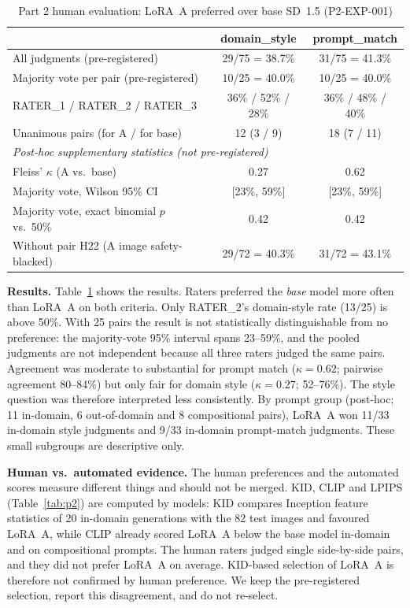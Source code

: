 \documentclass[conference]{IEEEtran}
\begin{document}
\begin{table}[t]\centering\caption{Part 2 human evaluation: LoRA~A preferred over base SD~1.5 (P2-EXP-001)}\label{tab:p2human}
\begin{tabular}{lcc}\toprule
 & domain\_style & prompt\_match\\\midrule
All judgments (pre-registered) & 29/75 = 38.7\% & 31/75 = 41.3\%\\
Majority vote per pair (pre-registered) & 10/25 = 40.0\% & 10/25 = 40.0\%\\
RATER\_1 / RATER\_2 / RATER\_3 & 36\% / 52\% / 28\% & 36\% / 48\% / 40\%\\
Unanimous pairs (for A / for base) & 12 (3 / 9) & 18 (7 / 11)\\\midrule
\multicolumn{3}{l}{\emph{Post-hoc supplementary statistics (not pre-registered)}}\\
Fleiss' $\kappa$ (A vs.\ base) & 0.27 & 0.62\\
Majority vote, Wilson 95\% CI & [23\%, 59\%] & [23\%, 59\%]\\
Majority vote, exact binomial $p$ vs.\ 50\% & 0.42 & 0.42\\
Without pair H22 (A image safety-blacked) & 29/72 = 40.3\% & 31/72 = 43.1\%\\\bottomrule
\end{tabular}\end{table}

\textbf{Results.} Table~\ref{tab:p2human} shows the results. Raters preferred the \emph{base} model more often than LoRA~A on both criteria. Only RATER\_2's domain-style rate (13/25) is above 50\%. With 25 pairs the result is not statistically distinguishable from no preference: the majority-vote 95\% interval spans 23--59\%, and the pooled judgments are not independent because all three raters judged the same pairs. Agreement was moderate to substantial for prompt match ($\kappa=0.62$; pairwise agreement 80--84\%) but only fair for domain style ($\kappa=0.27$; 52--76\%). The style question was therefore interpreted less consistently. By prompt group (post-hoc; 11 in-domain, 6 out-of-domain and 8 compositional pairs), LoRA~A won 11/33 in-domain style judgments and 9/33 in-domain prompt-match judgments. These small subgroups are descriptive only.

\textbf{Human vs.\ automated evidence.} The human preferences and the automated scores measure different things and should not be merged. KID, CLIP and LPIPS (Table~\ref{tab:p2}) are computed by models: KID compares Inception feature statistics of 20 in-domain generations with the 82 test images and favoured LoRA~A, while CLIP already scored LoRA~A below the base model in-domain and on compositional prompts. The human raters judged single side-by-side pairs, and they did not prefer LoRA~A on average. KID-based selection of LoRA~A is therefore not confirmed by human preference. We keep the pre-registered selection, report this disagreement, and do not re-select.
\end{document}
